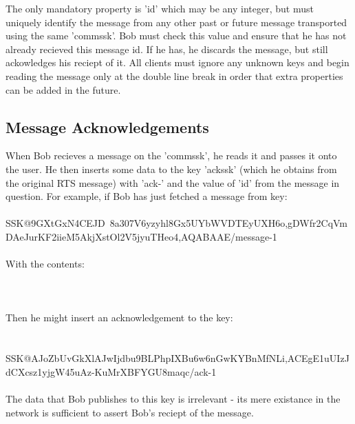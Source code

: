 \documentclass[12pt,a4paper]{article}
\begin{document}
The only mandatory property is 'id' which may be any integer, but must uniquely identify the message from any other past or future message transported using the same 'commssk'. Bob must check this value and ensure that he has not already recieved this message id. If he has, he discards the message, but still ackowledges his reciept of it. All clients must ignore any unknown keys and begin reading the message only at the double line break in order that extra properties can be added in the future.

\subsection{Message Acknowledgements}
When Bob recieves a message on the 'commssk', he reads it and passes it onto the user. He then inserts some data to the key 'ackssk' (which he obtains from the original RTS message) with 'ack-' and the value of 'id' from the message in question. For example, if Bob has just fetched a message from key: \\
\\
SSK@9GXtGxN4CEJD~8a\-307V6yzyhl8Gx5U\-YbWVDTEyUXH6o,gDWfr2CqVm\-DAeJurKF2iieM\-5AkjXstOl2V5j\-yuTHeo4,AQABAAE/message-1 \\
\\
With the contents: \\
\\

 \\
\\
Then he might insert an acknowledgement to the key: \\
\\
\\
SSK@AJoZbUvGkXlAJwI\-jdbu9BLPhpIXBu6\-w6nGwKYBnMfNLi,ACEgE1uUIzJdC\-Xcsz1yjgW45u\-Az-KuMrXBFYG\-U8maqc/ack-1 \\
\\
The data that Bob publishes to this key is irrelevant - its mere existance in the network is sufficient to assert Bob's reciept of the message.
\end{document}
